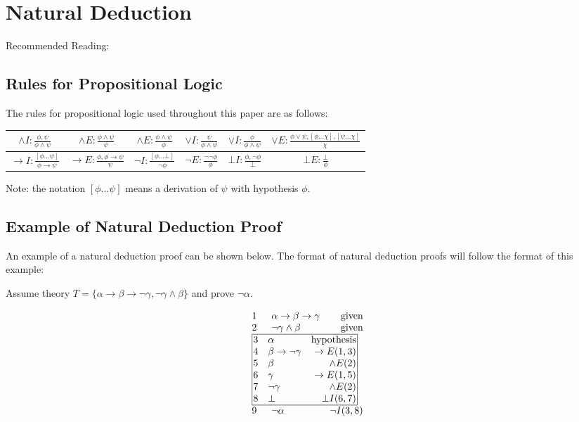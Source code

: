 \documentclass[11pt,twoside,a4paper]{report}
\begin{document}
\section{Natural Deduction}
\label{sec:nd}
Recommended Reading: \citep*[pp. 17-225]{languageproofandlogic}

\subsection{Rules for Propositional Logic}
\label{subsec:logicrules}
The rules for propositional logic used throughout this paper are as follows:

\begin{tabular}{|c|c|c|c|c|c|}
\hline
$\wedge I:\frac{\phi, \psi}{\phi\wedge\psi}$ &
$\wedge E:\frac{\phi\wedge\psi}{\psi}$ &
$\wedge E:\frac{\phi\wedge\psi}{\phi}$ &
$\vee I:\frac{\psi}{\phi\wedge\psi}$ & 
$\vee I:\frac{\phi}{\phi\wedge\psi}$ &
$\vee E:\frac{\phi\vee\psi, [\phi...\chi], [\psi...\chi]}{\chi}$ \\
\hline
$\rightarrow I:\frac{[\phi...\psi]}{\phi\rightarrow\psi}$ & 
$\rightarrow E:\frac{\phi, \phi\rightarrow\psi}{\psi}$ &
$\neg I:\frac{[\phi...\bot]}{\neg\phi}$ &
$\neg E:\frac{\neg\neg\phi}{\phi}$ &
$\bot I:\frac{\phi, \neg\phi}{\bot}$ &
$\bot E:\frac{\bot}{\phi}$ \\
\hline
\end{tabular}

Note: the notation $[\phi...\psi]$ means a derivation of $\psi$ with hypothesis $\phi$.

\subsection{Example of Natural Deduction Proof}
An example of a natural deduction proof can be shown below. The format of natural deduction proofs will follow the format of this example:

Assume theory $T = \{\alpha\rightarrow\beta\rightarrow\neg\gamma, \neg\gamma\wedge\beta\}$ and prove $\neg\alpha$.

\[\vbox{\offinterlineskip\halign{
&\tabskip=1.5em#\strut&$#$\hfil\tabskip=1em&\hfil$#$\tabskip=0em\cr
%
1&\alpha\rightarrow\beta\rightarrow\gamma&\mbox{given}\cr
2&\neg\gamma\wedge\beta&\mbox{given}\cr
%
\multispan3\vbox{\halign{
\vrule#&&\hskip.1em\tabskip=1em#\strut&$#$\hfil\tabskip=1em&\hfil$#$\hskip0.1em\tabskip=0em&\vrule#\cr
\noalign{\hrule}
%
&3&\alpha&\mbox{hypothesis}&\cr
&4&\beta\rightarrow\neg\gamma&\rightarrow E(1,3)&\cr
&5&\beta&\wedge E(2)&\cr
&6&\gamma&\rightarrow E(1,5)&\cr
&7&\neg\gamma&\wedge E(2)&\cr
&8&\bot&\bot I(6,7)&\cr
%
\noalign{\hrule}}}\,\cr
%
9&\neg\alpha&\neg I(3,8)\cr
}}\]
\end{document}
